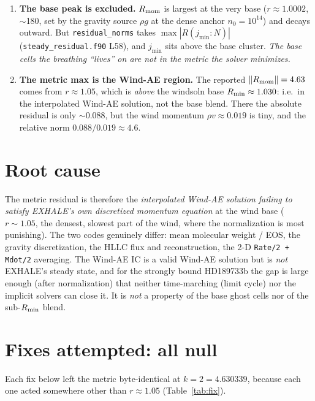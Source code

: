 \documentclass[english,a4paper]{my_memo}
\newcommand{\code}[1]{\texttt{#1}}
\begin{document}
\begin{enumerate}\itemsep2pt
  \item \textbf{The base peak is excluded.} $R_{\rm mom}$ is largest at the
        very base ($r\approx1.0002$, $\sim$180, set by the gravity source
        $\rho g$ at the dense anchor $n_0=10^{14}$) and decays outward. But
        \code{residual\_norms} takes $\max|R(j_{\min}\!:\!N)|$
        (\code{steady\_residual.f90} L58), and $j_{\min}$ sits above the base
        cluster. \emph{The base cells the breathing ``lives'' on are not in
        the metric the solver minimizes.}
  \item \textbf{The metric max is the Wind-AE region.} The reported
        $\lVert R_{\rm mom}\rVert=4.63$ comes from $r\approx1.05$, which is
        \emph{above} the windsoln base $R_{\rm min}\approx1.030$: i.e.\ in
        the interpolated Wind-AE solution, not the base blend. There the
        absolute residual is only $\sim$0.088, but the wind momentum
        $\rho v\approx0.019$ is tiny, and the relative norm
        $0.088/0.019\approx4.6$.
\end{enumerate}

\section{Root cause}
The metric residual is therefore the \emph{interpolated Wind-AE solution
failing to satisfy EXHALE's own discretized momentum equation} at the wind
base ($r\sim1.05$, the densest, slowest part of the wind, where the
normalization is most punishing). The two codes genuinely differ: mean
molecular weight / EOS, the gravity discretization, the HLLC flux and
reconstruction, the 2-D \code{Rate/2 + Mdot/2} averaging. The Wind-AE IC is
a valid Wind-AE solution but is \emph{not} EXHALE's steady state, and for
the strongly bound HD189733b the gap is large enough (after normalization)
that neither time-marching (limit cycle) nor the implicit solvers can close
it. It is \emph{not} a property of the base ghost cells nor of the
sub-$R_{\rm min}$ blend.

\section{Fixes attempted: all null}
Each fix below left the metric byte-identical at $k{=}2=4.630339$, because
each one acted somewhere other than $r\approx1.05$ (Table~\ref{tab:fix}).
\end{document}
